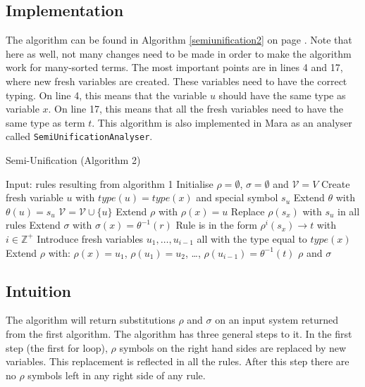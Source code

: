 \subsection{Implementation}
The algorithm can be found in Algorithm \ref{semiunification2} on page \pageref{semiunification2}. Note that here as well, not many changes need to be made in order to make the algorithm work for many-sorted terms. The most important points are in lines 4 and 17, where new fresh variables are created. These variables need to have the correct typing. On line 4, this means that the variable $u$ should have the same type as variable $x$. On line 17, this means that all the fresh variables need to have the same type as term $t$. This algorithm is also implemented in Mara as an analyser called \texttt{SemiUnificationAnalyser}.

\begin{algorithm}
\caption{Semi-Unification (Algorithm 2)}
\label{semiunification2}
\begin{algorithmic}[1]
\STATE Input: rules resulting from algorithm 1
\STATE Initialise $\rho = \emptyset$, $\sigma = \emptyset$ and $\mathcal{V} = V$
  \STATE Create fresh variable $u$ with $\textit{type}(u) = \textit{type}(x)$ and special symbol $s_u$
  \STATE Extend $\theta$ with $\theta(u) = s_u$
  \STATE $\mathcal{V} = \mathcal{V} \cup \{ u \}$
  \STATE Extend $\rho$ with $\rho(x) = u$
  \STATE Replace $\rho(s_x)$ with $s_u$ in all rules
\ENDFOR
{}
    \STATE Extend $\sigma$ with $\sigma(x) = \theta^{-1}(r)$
  \ENDIF
\ENDFOR
{}
  \STATE Rule is in the form $\rho^i(s_x) \rightarrow t$ with $i \in \mathbb{Z}^+$
  \STATE Introduce fresh variables $u_1, \dots, u_{i-1}$ all with the type equal to $\textit{type}(x)$
  \STATE Extend $\rho$ with: $\rho(x) = u_1$, $\rho(u_1) = u_2$, \dots, $\rho(u_{i-1}) = \theta^{-1}(t)$
\ENDFOR
\RETURN $\rho$ and $\sigma$
\end{algorithmic}
\end{algorithm}
\subsection{Intuition}
The algorithm will return substitutions $\rho$ and $\sigma$ on an input system returned from the first algorithm. The algorithm has three general steps to it. In the first step (the first for loop), $\rho$ symbols on the right hand sides are replaced by new variables. This replacement is reflected in all the rules. After this step there are no $\rho$ symbols left in any right side of any rule.  


